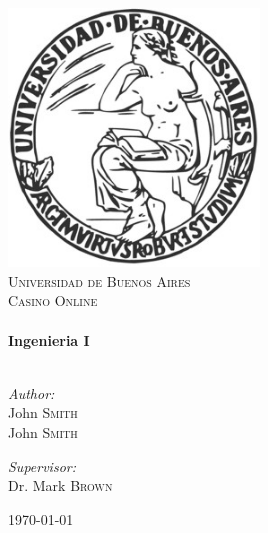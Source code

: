 \begin{titlepage}
 
\begin{center}
 
 
\includegraphics[width=0.5\textwidth]{./logo_uba_p.jpg}\\[1cm]
 
\textsc{\LARGE Universidad de Buenos Aires}\\[1.5cm]
 
\textsc{\Large Casino Online}\\[0.5cm]
 
 
\HRule \\[0.4cm]
{ \huge \bfseries Ingenieria I}\\[0.4cm]
 
\HRule \\[1.5cm]
 
\begin{minipage}{0.4\textwidth}
\begin{flushleft} \large
\emph{Author:}\\
John \textsc{Smith}\\
John \textsc{Smith}
\end{flushleft}
\end{minipage}
\begin{minipage}{0.4\textwidth}
\begin{flushright} \large
\emph{Supervisor:} \\
Dr. Mark \textsc{Brown}
\end{flushright}
\end{minipage}
 
\vfill
 
{\large \today}
 
\end{center}
 
\end{titlepage}
